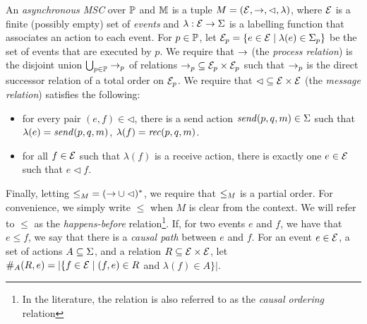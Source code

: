 \begin{definition}
An \emph{asynchronous MSC}  over $\Procs$ and $\Msg$ is a tuple $\msc = (\Events,\procrel,\lhd,\lambda)$, where $\Events$ is a finite (possibly empty) set of \emph{events} and $\lambda: \Events \to \Act$ is a labelling function that associates an action to each event. For $p \in \Procs$, let $\Events_p = \{e \in \Events \mid \lambda(e) \in \pAct{p}\}$ be the set of events that are executed by $p$. We require that $\procrel$ (the \emph{process relation}) is the disjoint union $\bigcup_{p \in \Procs} \procrel_p$ of relations ${\procrel_p} \subseteq \Events_p \times \Events_p$ such that $\procrel_p$ is the direct successor relation of a total order on $\Events_p$.  We require that ${\lhd} \subseteq \Events \times \Events$ (the \emph{message relation}) satisfies the following:
\begin{itemize}%
\item[(1)] for every pair $(e,f) \in {\lhd}$, there is a send action $\sact{p}{q}{\msg} \in \Act$ such that $\lambda(e) = \sact{p}{q}{\msg}$, $\lambda(f) = \ract{p}{q}{\msg}$.
\item[(2)] for all $f \in \Events$ such that $\lambda(f)$ is a receive action, there is exactly one $e \in \Events$ such that $e \lhd f$.
\end{itemize}
Finally, letting ${\le}_\msc = ({\procrel} \cup {\lhd})^\ast$,
we require that $\le_\msc$ is a partial order. For convenience, we simply write $\le$ when $M$ is clear from the context. We will refer to $\le$ as the \emph{happens-before} relation\footnote{In the literature, the relation is also referred to as the \emph{causal ordering} relation}. If, for two events $e$ and $f$, we have that $e \le f$, we   say that there is a \emph{causal path} between $e$ and $f$.
For an event $e \in \Events$, a set of actions $A \subseteq \Act$, and a relation $\rel \subseteq \Events \times \Events$,
let $\sametype{e}{A}{\rel} = |\{f \in \Events \mid (f,e) \in \rel$ and $\lambda(f) \in A\}|$.
\end{definition}

